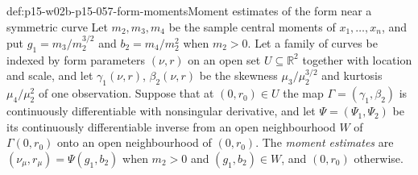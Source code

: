 \begin{hbdefinition}{def:p15-w02b-p15-057-form-moments}{Moment estimates of the form near a symmetric curve}
Let \(m_2,m_3,m_4\) be the sample central moments of \(x_1,\ldots,x_n\), and
put \(g_1=m_3/m_2^{3/2}\) and \(b_2=m_4/m_2^2\) when \(m_2>0\). Let a family
of curves be indexed by form parameters \((\nu,r)\) on an open set
\(U\subseteq\mathbb R^2\) together with location and scale, and let
\(\gamma_1(\nu,r)\), \(\beta_2(\nu,r)\) be the skewness
\(\mu_3/\mu_2^{3/2}\) and kurtosis \(\mu_4/\mu_2^2\) of one observation.
Suppose that at \((0,r_0)\in U\) the map
\(\Gamma=(\gamma_1,\beta_2)\) is continuously differentiable with
nonsingular derivative, and let \(\Psi=(\Psi_1,\Psi_2)\) be its
continuously differentiable inverse from an open neighbourhood \(W\) of
\(\Gamma(0,r_0)\) onto an open neighbourhood of \((0,r_0)\). The
\emph{moment estimates} are \((\nu_\mu,r_\mu)=\Psi(g_1,b_2)\) when
\(m_2>0\) and \((g_1,b_2)\in W\), and \((0,r_0)\) otherwise.
\end{hbdefinition}

